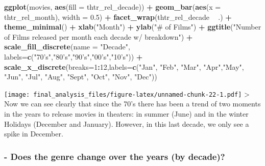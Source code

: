 \documentclass[]{article}
\newenvironment{Shaded}{\begin{snugshade}}{\end{snugshade}}
\newcommand{\DataTypeTok}[1]{\textcolor[rgb]{0.13,0.29,0.53}{#1}}
\newcommand{\DecValTok}[1]{\textcolor[rgb]{0.00,0.00,0.81}{#1}}
\newcommand{\FloatTok}[1]{\textcolor[rgb]{0.00,0.00,0.81}{#1}}
\newcommand{\KeywordTok}[1]{\textcolor[rgb]{0.13,0.29,0.53}{\textbf{#1}}}
\newcommand{\NormalTok}[1]{#1}
\newcommand{\OperatorTok}[1]{\textcolor[rgb]{0.81,0.36,0.00}{\textbf{#1}}}
\newcommand{\StringTok}[1]{\textcolor[rgb]{0.31,0.60,0.02}{#1}}
\begin{document}
\begin{Shaded}
\begin{Highlighting}[]
\KeywordTok{ggplot}\NormalTok{(movies, }\KeywordTok{aes}\NormalTok{(}\DataTypeTok{fill =}\NormalTok{ thtr_rel_decade)) }\OperatorTok{+}\StringTok{ }\KeywordTok{geom_bar}\NormalTok{(}\KeywordTok{aes}\NormalTok{(}\DataTypeTok{x =}\NormalTok{ thtr_rel_month), }\DataTypeTok{width =} \FloatTok{0.5}\NormalTok{) }\OperatorTok{+}\StringTok{ }\KeywordTok{facet_wrap}\NormalTok{(thtr_rel_decade }\OperatorTok{~}\StringTok{ }\NormalTok{.) }\OperatorTok{+}\StringTok{ }\KeywordTok{theme_minimal}\NormalTok{() }\OperatorTok{+}\StringTok{ }\KeywordTok{xlab}\NormalTok{(}\StringTok{"Month"}\NormalTok{) }\OperatorTok{+}\StringTok{ }\KeywordTok{ylab}\NormalTok{(}\StringTok{"# of Films"}\NormalTok{) }\OperatorTok{+}\StringTok{ }\KeywordTok{ggtitle}\NormalTok{(}\StringTok{"Number of Films released per month each decade w/ breakdown"}\NormalTok{) }\OperatorTok{+}\StringTok{ }\KeywordTok{scale_fill_discrete}\NormalTok{(}\DataTypeTok{name =} \StringTok{"Decade"}\NormalTok{, }\DataTypeTok{labels=}\KeywordTok{c}\NormalTok{(}\StringTok{"70's"}\NormalTok{,}\StringTok{"80's"}\NormalTok{,}\StringTok{"90's"}\NormalTok{,}\StringTok{"00's"}\NormalTok{,}\StringTok{"10's"}\NormalTok{)) }\OperatorTok{+}\StringTok{ }\KeywordTok{scale_x_discrete}\NormalTok{(}\DataTypeTok{breaks=}\DecValTok{1}\OperatorTok{:}\DecValTok{12}\NormalTok{,}\DataTypeTok{labels=}\KeywordTok{c}\NormalTok{(}\StringTok{"Jan"}\NormalTok{, }\StringTok{"Feb"}\NormalTok{, }\StringTok{"Mar"}\NormalTok{, }\StringTok{"Apr"}\NormalTok{,}\StringTok{"May"}\NormalTok{, }\StringTok{"Jun"}\NormalTok{, }\StringTok{"Jul"}\NormalTok{, }\StringTok{"Aug"}\NormalTok{, }\StringTok{"Sept"}\NormalTok{, }\StringTok{"Oct"}\NormalTok{, }\StringTok{"Nov"}\NormalTok{, }\StringTok{"Dec"}\NormalTok{))}
\end{Highlighting}
\end{Shaded}

\texttt{[image: final\_analysis\_files/figure-latex/unnamed-chunk-22-1.pdf]}
\textgreater{} Now we can see clearly that since the 70's there has been
a trend of two moments in the years to release movies in theaters: in
summer (June) and in the winter Holidays (December and January).
However, in this last decade, we only see a spike in December.

\hypertarget{does-the-genre-change-over-the-years-by-decade}{%
\subsubsection{- Does the genre change over the years (by
decade)?}\label{does-the-genre-change-over-the-years-by-decade}}
\end{document}
